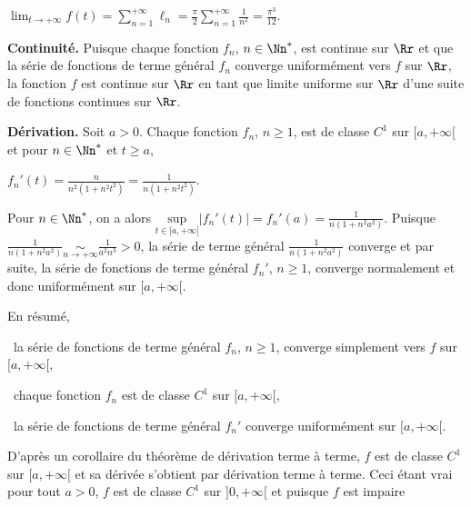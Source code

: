 {{\begin{center}
$\lim_{t \rightarrow +\infty}f(t)=\sum_{n=1}^{+\infty}\ell_n=\frac{\pi}{2}\sum_{n=1}^{+\infty}\frac{1}{n^2}=\frac{\pi^3}{12}$.
\end{center}

\begin{center}
\end{center}

\textbf{Continuité.} Puisque chaque fonction $f_n$, $n\in\Nn^*$, est continue sur $\Rr$ et que la série de fonctions de terme général $f_n$ converge uniformément vers $f$ sur $\Rr$, la fonction $f$ est continue sur $\Rr$ en tant que limite uniforme sur $\Rr$ d'une suite de fonctions continues sur $\Rr$.

\begin{center}
\end{center}

\textbf{Dérivation.} Soit $a>0$. Chaque fonction $f_n$, $n\geqslant1$, est de classe $C^1$ sur $[a,+\infty[$ et pour $n\in\Nn^*$ et $t\geqslant a$,

\begin{center}
$f_n'(t)=\frac{n}{n^2(1+n^2t^2)}=\frac{1}{n(1+n^2t^2)}$.
\end{center}

Pour $n\in\Nn^*$, on a alors $\underset{t\in[a,+\infty[}{\text{sup}}|f_n'(t)|=f_n'(a)=\frac{1}{n(1+n^2a^2)}$. Puisque $\frac{1}{n(1+n^2a^2)}\underset{n\rightarrow+\infty}{\sim}\frac{1}{a^2n^3}>0$, la série de terme général $\frac{1}{n(1+n^2a^2)}$ converge et par suite, la série de fonctions de terme général $f_n'$, $n\geqslant1$, converge normalement et donc uniformément sur $[a,+\infty[$.

En résumé,

\textbullet~la série de fonctions de terme général $f_n$, $n\geqslant 1$, converge simplement vers $f$ sur $[a,+\infty[$,

\textbullet~chaque fonction $f_n$ est de classe $C^1$ sur $[a,+\infty[$,

\textbullet~la série de fonctions de terme général $f_n'$ converge uniformément sur $[a,+\infty[$.

D'après un corollaire du théorème de dérivation terme à terme, $f$ est de classe $C^1$ sur $[a,+\infty[$ et sa dérivée s'obtient par dérivation terme à terme. Ceci étant vrai pour tout $a>0$, $f$ est de classe $C^1$ sur $]0,+\infty[$ et puisque $f$ est impaire

}}
